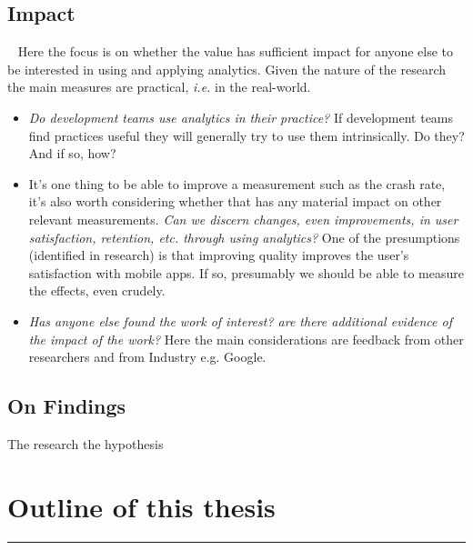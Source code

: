 \subsection{Impact}~\label{section-impact}
Here the focus is on whether the value has sufficient impact for anyone else to be interested in using and applying analytics. Given the nature of the research the main measures are practical, \emph{i.e.} in the real-world.
\begin{itemize}
    \item \emph{Do development teams use analytics in their practice?} If development teams find practices useful they will generally try to use them intrinsically. Do they? And if so, how?
    \item It's one thing to be able to improve a measurement such as the crash rate, it's also worth considering whether that has any material impact on other relevant measurements. \emph{Can we discern changes, even improvements, in user satisfaction, retention, etc. through using analytics?} One of the presumptions (identified in research) is that improving quality improves the user's satisfaction with mobile apps. If so, presumably we should be able to measure the effects, even crudely.
    \item \emph{Has anyone else found the work of interest? are there additional evidence of the impact of the work?} Here the main considerations are feedback from other researchers and from Industry e.g. Google.
\end{itemize}



\subsection{On Findings}

The research  the hypothesis 



\section{Outline of this thesis}


\par\noindent\rule{\textwidth}{0.4pt}
